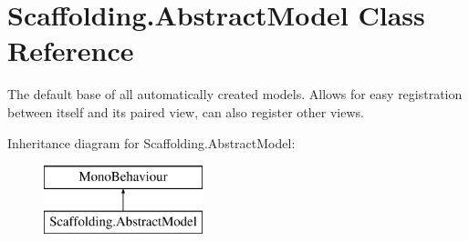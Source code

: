 \hypertarget{class_scaffolding_1_1_abstract_model}{\section{Scaffolding.\+Abstract\+Model Class Reference}
\label{class_scaffolding_1_1_abstract_model}
}


The default base of all automatically created models. Allows for easy registration between itself and its paired view, can also register other views.  


Inheritance diagram for Scaffolding.\+Abstract\+Model\+:\begin{figure}[H]
\begin{center}
\leavevmode
\includegraphics[height=2.000000cm]{class_scaffolding_1_1_abstract_model}
\end{center}
\end{figure}
